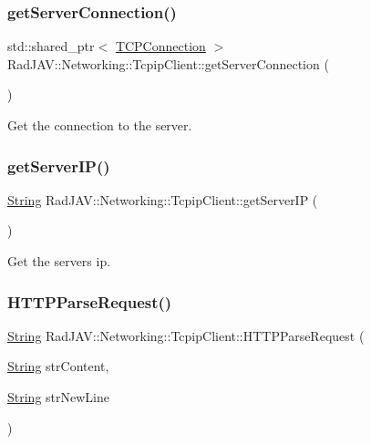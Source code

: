 \subsubsection{\texorpdfstring{get\+Server\+Connection()}{getServerConnection()}}
{\footnotesize\ttfamily std\+::shared\+\_\+ptr$<$ \mbox{\hyperlink{class_rad_j_a_v_1_1_networking_1_1_t_c_p_connection}{T\+C\+P\+Connection}} $>$ Rad\+J\+A\+V\+::\+Networking\+::\+Tcpip\+Client\+::get\+Server\+Connection (\begin{DoxyParamCaption}{ }\end{DoxyParamCaption})}



Get the connection to the server. 

\mbox{\label{class_rad_j_a_v_1_1_networking_1_1_tcpip_client_ae03a4a7b2e26c9cf5dbcd788a4694c47}} 
\subsubsection{\texorpdfstring{get\+Server\+I\+P()}{getServerIP()}}
{\footnotesize\ttfamily \mbox{\hyperlink{class_rad_j_a_v_1_1_string}{String}} Rad\+J\+A\+V\+::\+Networking\+::\+Tcpip\+Client\+::get\+Server\+IP (\begin{DoxyParamCaption}{ }\end{DoxyParamCaption})}



Get the server\textquotesingle{}s ip. 

\mbox{\label{class_rad_j_a_v_1_1_networking_1_1_tcpip_client_ae462f01cc5fbb9bfed9617857015002b}} 
\subsubsection{\texorpdfstring{H\+T\+T\+P\+Parse\+Request()}{HTTPParseRequest()}}
{\footnotesize\ttfamily \mbox{\hyperlink{class_rad_j_a_v_1_1_string}{String}} Rad\+J\+A\+V\+::\+Networking\+::\+Tcpip\+Client\+::\+H\+T\+T\+P\+Parse\+Request (\begin{DoxyParamCaption}\item[{\mbox{\hyperlink{class_rad_j_a_v_1_1_string}{String}}}]{str\+Content,  }\item[{\mbox{\hyperlink{class_rad_j_a_v_1_1_string}{String}}}]{str\+New\+Line }\end{DoxyParamCaption})}



